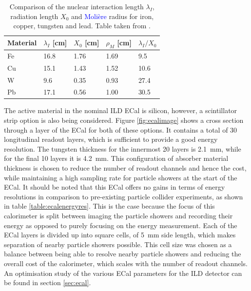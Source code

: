\begin{table}[h!]
\centering
\begin{tabular}{ l l l l l}
\hline
Material & $\lambda_{I}$ [cm] & $X_{0}$ [cm] & $\rho_{M}$ [cm] & $ \lambda_{I}/X_{0}$ \\
\hline
Fe & 16.8 & 1.76 & 1.69 & 9.5 \\
Cu & 15.1 & 1.43 & 1.52 & 10.6 \\
W & 9.6 & 0.35 & 0.93 & 27.4 \\
Pb & 17.1 & 0.56 & 1.00 & 30.5 \\
\hline
\end{tabular}
\caption[Comparison of the nuclear interaction length $\lambda_{I}$, radiation length $X_{0}$ and \textcolor{blue}{Moli\`{e}re} radius for iron, copper, tungsten and lead.  Table taken from \cite{arXiv:0907.3577}.]{Comparison of the nuclear interaction length $\lambda_{I}$, radiation length $X_{0}$ and \textcolor{blue}{Moli\`{e}re} radius for iron, copper, tungsten and lead.  Table taken from \cite{arXiv:0907.3577}.}
\label{table:absorberoptions}
\end{table}

The active material in the nominal ILD ECal is silicon, however, a scintillator strip option is also being considered.  Figure \ref{fig:ecalimage} shows a cross section through a layer of the ECal for both of these options.  It contains a total of 30 longitudinal readout layers, which is sufficient to provide a good energy resolution.  The tungsten thickness for the innermost 20 layers is 2.1~mm, while for the final 10 layers it is 4.2~mm.  This configuration of absorber material thickness is chosen to reduce the number of readout channels and hence the cost, while maintaining a high sampling rate for particle showers at the start of the ECal.  It should be noted that this ECal offers no gains in terms of energy resolutions in comparison to pre-existing particle collider experiments, as shown in table \ref{table:ecalenergyres}.  This is the case because the focus of this calorimeter is split between imaging the particle showers and recording their energy as opposed to purely focusing on the energy measurement.  Each of the ECal layers is divided up into square cells, of 5~mm side length, which makes separation of nearby particle showers possible.  This cell size was chosen as a balance between being able to resolve nearby particle showers and reducing the overall cost of the calorimeter, which scales with the number of readout channels.  An optimisation study of the various ECal parameters for the ILD detector can be found in section \ref{sec:ecal}.

